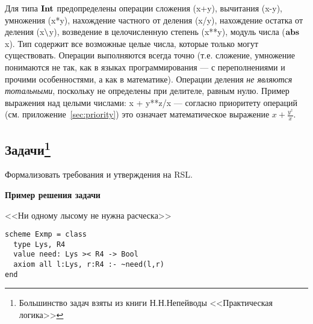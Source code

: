 \documentclass[12pt]{extreport}
\begin{document}
Для типа $\textbf{Int}$ предопределены операции сложения (x+y), вычитания (x-y), умножения (x*y), нахождение частного от деления (x/y), нахождение остатка от деления (x$\mathop{\setminus}$y), возведение в целочисленную степень (x**y), модуль числа ($\mathop{\textbf{abs}}$ x). Тип содержит все возможные целые числа, которые только могут существовать. Операции выполняются всегда точно (т.е. сложение, умножение понимаются не так, как в языках программирования --- с переполнениями и прочими особенностями, а как в математике). Операции деления \emph{не являются тотальными}, поскольку не определены при делителе, равным нулю. Пример выражения над целыми числами: x + y**z/x --- согласно приоритету операций (см. приложение~\ref{sec:priority}) это означает математическое выражение $x + \frac{y^z}{x}$.


\subsection*{Задачи\footnote{Большинство задач взяты из книги Н.Н.Непейводы <<Практическая логика>>}}

Формализовать требования и утверждения на RSL.

\textbf{Пример решения задачи}

<<Ни одному лысому не нужна расческа>>

\begin{lstlisting}
scheme Exmp = class
  type Lys, R4
  value need: Lys >< R4 -> Bool
  axiom all l:Lys, r:R4 :- ~need(l,r)
end
\end{lstlisting}
\end{document}
